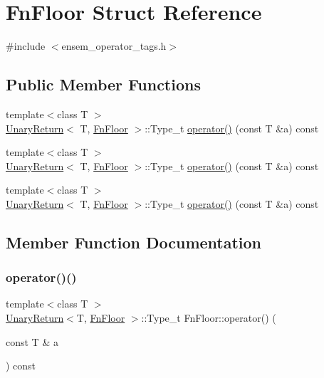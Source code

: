 \hypertarget{structFnFloor}{}\section{Fn\+Floor Struct Reference}
\label{structFnFloor}


{\ttfamily \#include $<$ensem\+\_\+operator\+\_\+tags.\+h$>$}

\subsection*{Public Member Functions}
\begin{DoxyCompactItemize}
\item 
{\footnotesize template$<$class T $>$ }\\\mbox{\hyperlink{structUnaryReturn}{Unary\+Return}}$<$ T, \mbox{\hyperlink{structFnFloor}{Fn\+Floor}} $>$\+::Type\+\_\+t \mbox{\hyperlink{structFnFloor_ab74b902d8ab286ae5ec2c6066140919b}{operator()}} (const T \&a) const
\item 
{\footnotesize template$<$class T $>$ }\\\mbox{\hyperlink{structUnaryReturn}{Unary\+Return}}$<$ T, \mbox{\hyperlink{structFnFloor}{Fn\+Floor}} $>$\+::Type\+\_\+t \mbox{\hyperlink{structFnFloor_ab74b902d8ab286ae5ec2c6066140919b}{operator()}} (const T \&a) const
\item 
{\footnotesize template$<$class T $>$ }\\\mbox{\hyperlink{structUnaryReturn}{Unary\+Return}}$<$ T, \mbox{\hyperlink{structFnFloor}{Fn\+Floor}} $>$\+::Type\+\_\+t \mbox{\hyperlink{structFnFloor_ab74b902d8ab286ae5ec2c6066140919b}{operator()}} (const T \&a) const
\end{DoxyCompactItemize}


\subsection{Member Function Documentation}
\mbox{\label{structFnFloor_ab74b902d8ab286ae5ec2c6066140919b}} 
\subsubsection{\texorpdfstring{operator()()}{operator()()}\hspace{0.1cm}{\footnotesize\ttfamily [1/3]}}
{\footnotesize\ttfamily template$<$class T $>$ \\
\mbox{\hyperlink{structUnaryReturn}{Unary\+Return}}$<$T, \mbox{\hyperlink{structFnFloor}{Fn\+Floor}} $>$\+::Type\+\_\+t Fn\+Floor\+::operator() (\begin{DoxyParamCaption}\item[{const T \&}]{a }\end{DoxyParamCaption}) const\hspace{0.3cm}{\ttfamily [inline]}}

